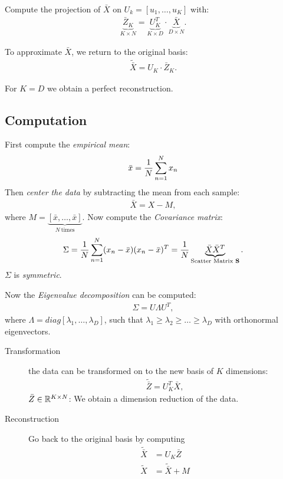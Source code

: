 Compute the projection of $\bar X$ on $U_k = [u_1,\ldots, u_K]$  with:
\begin{align*}
    \underbrace{\bar Z_K}_{K\times N} = 
        \underbrace{U_K^T}_{K\times D} \cdot \underbrace{\bar X}_{D \times N}.
\end{align*}

To approximate $\bar X$, we return to the original basis:
\begin{align*}
    \tilde{\bar X} = U_K\cdot \bar Z_K.
\end{align*}

For $K=D$  we obtain a perfect reconstruction.

\subsection{Computation}
First compute the \emph{empirical mean}:
\begin{align*}
\bar x = {1\over N} \sum_{n=1}^N x_n
\end{align*}
Then \emph{center the data} by subtracting the mean from each sample:
\begin{align*}
\bar X = X-M,
\end{align*}
where $M=\underbrace{[\bar x, \ldots, \bar x]}_{N\ \text{times}}$.
Now compute the \emph{Covariance matrix}:
\begin{align*}
\Sigma = {1\over N} \sum_{n=1}^N (x_n-\bar x)(x_n-\bar x)^T = {1\over N} \underbrace{\bar X\bar X^T}_{\text{Scatter Matrix }\mathbf S}.
\end{align*}
$\Sigma$ is \emph{symmetric}. 

Now the \emph{Eigenvalue decomposition} can be computed:
\begin{align*}
\Sigma = U\Lambda U^T,
\end{align*}
where $\Lambda = diag[\lambda_1, \ldots, \lambda_D]$, such that $\lambda_1 \geq \lambda_2 \geq \ldots \geq \lambda_D$ with orthonormal eigenvectors.

\begin{description}
\item[Transformation] the data can be transformed on to the new basis of $K$ dimensions:
\begin{align*}
    \tilde{\bar Z} = U_K^T \bar X,
\end{align*}
$\bar Z \in \mathbb{R}^{K\times N}$: We obtain a dimension reduction of the data.
\item[Reconstruction] Go back to the original basis by computing
\begin{align*}
    \tilde{\bar X} &= U_K \bar Z\\
    \tilde X &= \tilde{\bar X}+M
\end{align*}


\end{description}



